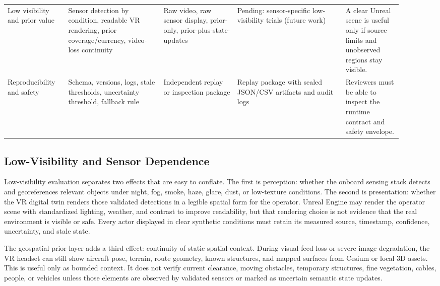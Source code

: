 \documentclass[fleqn]{VRIH2025}
\begin{document}
\begin{longtable}{@{}L{0.14\linewidth}L{0.22\linewidth}L{0.17\linewidth}L{0.25\linewidth}L{0.13\linewidth}@{}}
Low visibility and prior value & Sensor detection by condition, readable VR rendering, prior coverage/currency, video-loss continuity & Raw video, raw sensor display, prior-only, prior-plus-state-updates & Pending: sensor-specific low-visibility trials (future work) & A clear Unreal scene is useful only if source limits and unobserved regions stay visible. \\
Reproducibility and safety & Schema, versions, logs, stale thresholds, uncertainty threshold, fallback rule & Independent replay or inspection package & Replay package with sealed JSON/CSV artifacts and audit logs & Reviewers must be able to inspect the runtime contract and safety envelope. \\
\bottomrule
\end{longtable}
\endgroup

\subsection{Low-Visibility and Sensor Dependence}

Low-visibility evaluation separates two effects that are easy to conflate. The first is perception: whether the onboard sensing stack detects and georeferences relevant objects under night, fog, smoke, haze, glare, dust, or low-texture conditions. The second is presentation: whether the VR digital twin renders those validated detections in a legible spatial form for the operator. Unreal Engine may render the operator scene with standardized lighting, weather, and contrast to improve readability, but that rendering choice is not evidence that the real environment is visible or safe. Every actor displayed in clear synthetic conditions must retain its measured source, timestamp, confidence, uncertainty, and stale state.

The geospatial-prior layer adds a third effect: continuity of static spatial context. During visual-feed loss or severe image degradation, the VR headset can still show aircraft pose, terrain, route geometry, known structures, and mapped surfaces from Cesium or local 3D assets. This is useful only as bounded context. It does not verify current clearance, moving obstacles, temporary structures, fine vegetation, cables, people, or vehicles unless those elements are observed by validated sensors or marked as uncertain semantic state updates.
\end{document}
